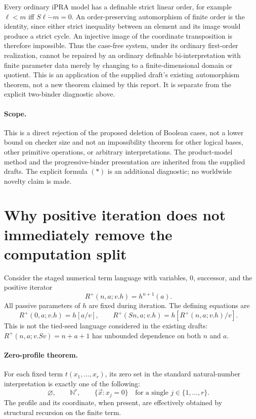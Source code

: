 \documentclass[11pt,letterpaper]{article}
\theoremstyle{definition}\newtheorem{definition}[theorem]{Definition}
\theoremstyle{remark}\newtheorem{remark}[theorem]{Remark}
\providecommand{\dotminus}{\mathbin{\dot{-}}}
\begin{document}
Every ordinary iPRA model has a definable strict linear order, for example
$\ell<m$ iff $S\ell\mathbin{\dotminus}m=0$. An order-preserving
automorphism of finite order is the identity, since either strict
inequality between an element and its image would produce a strict
cycle. An injective image of the coordinate transposition is therefore
impossible. Thus the case-free system, under its ordinary first-order
realization, cannot be repaired by an ordinary definable bi-interpretation
with finite parameter data merely by changing to a finite-dimensional
domain or quotient. This is an application of the supplied draft's
existing automorphism theorem, not a new theorem claimed by this report.
It is separate from the explicit two-binder diagnostic above.

\paragraph{Scope.}
This is a direct rejection of the proposed deletion of Boolean cases,
not a lower bound on checker size and not an impossibility theorem for
other logical bases, other primitive operations, or arbitrary
interpretations. The product-model method and the progressive-binder
presentation are inherited from the supplied drafts. The explicit
formula $(*)$ is an additional diagnostic; no worldwide novelty claim
is made.

\section{Why positive iteration does not immediately remove the computation split}

Consider the staged numerical term language with variables, $0$, successor,
and the positive iterator
\[
 R^+(n,a;v.h)=h^{n+1}(a).
\]
All passive parameters of $h$ are fixed during iteration.  The defining
equations are
\[
 R^+(0,a;v.h)=h[a/v],\qquad
 R^+(Sn,a;v.h)=h[R^+(n,a;v.h)/v].
\]
This is not the tied-seed language considered in the existing drafts:
$R^+(n,a;v.Sv)=n+a+1$ has unbounded dependence on both $n$ and $a$.

\paragraph{Zero-profile theorem.}
For each fixed term $t(x_1,\ldots,x_r)$, its zero set in the standard
natural-number interpretation is exactly one of the following:
\[
 \varnothing,\qquad \mathbb N^r,\qquad
 \{\vec x:x_j=0\}\quad\text{for a single }j\in\{1,\ldots,r\}.
\]
The profile and its coordinate, when present, are effectively obtained
by structural recursion on the finite term.
\end{document}
